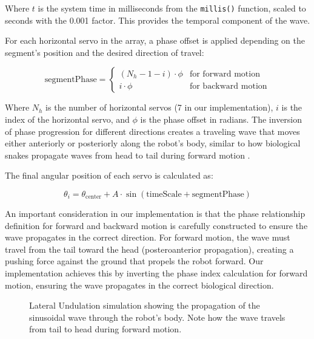 \documentclass[12pt,a4paper]{report}
\begin{document}
Where $t$ is the system time in milliseconds from the \texttt{millis()} function, scaled to seconds with the 0.001 factor. This provides the temporal component of the wave.

For each horizontal servo in the array, a phase offset is applied depending on the segment's position and the desired direction of travel:

\begin{equation}
\text{segmentPhase} = 
\begin{cases}
(N_h - 1 - i) \cdot \phi & \text{for forward motion} \\
i \cdot \phi & \text{for backward motion}
\end{cases}
\end{equation}

Where $N_h$ is the number of horizontal servos (7 in our implementation), $i$ is the index of the horizontal servo, and $\phi$ is the phase offset in radians. The inversion of phase progression for different directions creates a traveling wave that moves either anteriorly or posteriorly along the robot's body, similar to how biological snakes propagate waves from head to tail during forward motion \parencite{liljeback-2013}.

The final angular position of each servo is calculated as:

\begin{equation}
\theta_i = \theta_{\text{center}} + A \cdot \sin(\text{timeScale} + \text{segmentPhase})
\end{equation}

An important consideration in our implementation is that the phase relationship definition for forward and backward motion is carefully constructed to ensure the wave propagates in the correct direction. For forward motion, the wave must travel from the tail toward the head (posteroanterior propagation), creating a pushing force against the ground that propels the robot forward. Our implementation achieves this by inverting the phase index calculation for forward motion, ensuring the wave propagates in the correct biological direction.


\begin{figure}
  \centering
  \caption{Lateral Undulation simulation showing the propagation of the sinusoidal wave through the robot's body. Note how the wave travels from tail to head during forward motion.}
  \label{fig:lateral-anim}
\end{figure}
\end{document}
